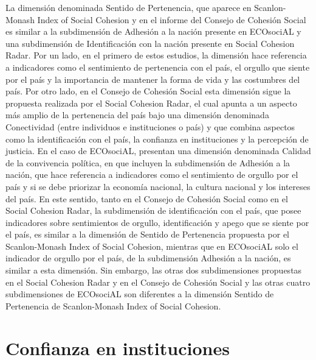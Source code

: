 \documentclass[
  12pt,
]{book}
\begin{document}
La dimensión denominada Sentido de Pertenencia, que aparece en Scanlon-Monash Index of Social Cohesion y en el informe del Consejo de Cohesión Social es similar a la subdimensión de Adhesión a la nación presente en ECOsociAL y una subdimensión de Identificación con la nación presente en Social Cohesion Radar. Por un lado, en el primero de estos estudios, la dimensión hace referencia a indicadores como el sentimiento de pertenencia con el país, el orgullo que siente por el país y la importancia de mantener la forma de vida y las costumbres del país. Por otro lado, en el Consejo de Cohesión Social esta dimensión sigue la propuesta realizada por el Social Cohesion Radar, el cual apunta a un aspecto más amplio de la pertenencia del país bajo una dimensión denominada Conectividad (entre individuos e instituciones o país) y que combina aspectos como la identificación con el país, la confianza en instituciones y la percepción de justicia. En el caso de ECOsociAL, presentan una dimensión denominada Calidad de la convivencia política, en que incluyen la subdimensión de Adhesión a la nación, que hace referencia a indicadores como el sentimiento de orgullo por el país y si se debe priorizar la economía nacional, la cultura nacional y los intereses del país. En este sentido, tanto en el Consejo de Cohesión Social como en el Social Cohesion Radar, la subdimensión de identificación con el país, que posee indicadores sobre sentimientos de orgullo, identificación y apego que se siente por el país, es similar a la dimensión de Sentido de Pertenencia propuesta por el Scanlon-Monash Index of Social Cohesion, mientras que en ECOsociAL solo el indicador de orgullo por el país, de la subdimensión Adhesión a la nación, es similar a esta dimensión. Sin embargo, las otras dos subdimensiones propuestas en el Social Cohesion Radar y en el Consejo de Cohesión Social y las otras cuatro subdimensiones de ECOsociAL son diferentes a la dimensión Sentido de Pertenencia de Scanlon-Monash Index of Social Cohesion.

\hypertarget{confianza-en-instituciones}{%
\section{Confianza en instituciones}\label{confianza-en-instituciones}}
\end{document}
